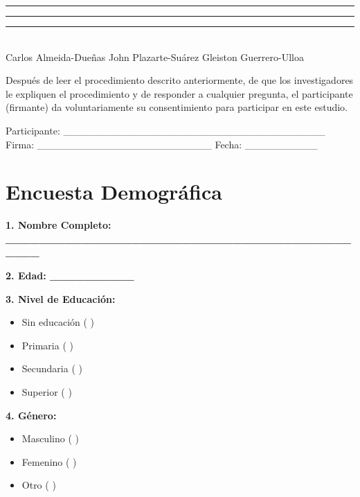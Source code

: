 \documentclass[a4paper,fleqn]{cas-sc}
\begin{document}
	\vspace{0.5cm}
	\noindent\rule{3.65cm}{0.4pt} \hspace{1.1cm} \rule{4cm}{0.4pt} \hspace{1.1cm} \rule{4.2cm}{0.4pt}\\
	Carlos Almeida-Dueñas \hspace{2cm} John Plazarte-Suárez \hspace{2cm} Gleiston Guerrero-Ulloa
	
	Después de leer el procedimiento descrito anteriormente, de que los investigadores le expliquen el procedimiento y de responder a cualquier pregunta, el participante (firmante) da voluntariamente su consentimiento para participar en este estudio.
	
	\vspace{0.5cm}
	\noindent
	Participante: \_\_\_\_\_\_\_\_\_\_\_\_\_\_\_\_\_\_\_\_\_\_\_\_\_\_\_\_\_\_\_\_\_\_\_\_
	Firma: \_\_\_\_\_\_\_\_\_\_\_\_\_\_\_\_\_\_\_\_\_\_\_\_
	Fecha: \_\_\_\_\_\_\_\_\_\_
	
	\clearpage
	\section[\appendixname~\thesection]{Encuesta Demográfica} \label{Appendix:DemographicSurvey}
	\vspace{12pt}
	\noindent
	\textbf{1. Nombre Completo: \_\_\_\_\_\_\_\_\_\_\_\_\_\_\_\_\_\_\_\_\_\_\_\_\_\_\_\_\_\_\_\_\_\_\_\_\_\_\_\_\_\_\_\_\_}
	
	\vspace{12pt}
	\noindent
	\textbf{2. Edad: \_\_\_\_\_\_\_\_\_\_}
	
	\vspace{12pt}
	\noindent				
	\textbf{3. Nivel de Educación:}
	
	\begin{itemize}
		\item Sin educación ( )
		\item Primaria ( )
		\item Secundaria ( )
		\item Superior ( )
	\end{itemize}
	
	\noindent
	\textbf{4. Género:}
	
	\begin{itemize}
		\item Masculino ( )
		\item Femenino ( )
		\item Otro ( )
	\end{itemize}
	
\end{document}
